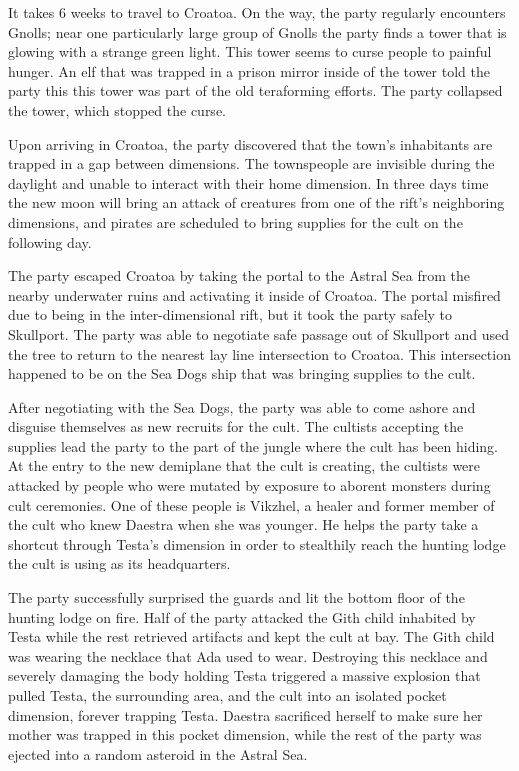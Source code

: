 It takes 6 weeks to travel to Croatoa.
On the way, the party regularly encounters Gnolls; near one particularly large group of Gnolls the party finds a tower that is glowing with a strange green light.
This tower seems to curse people to painful hunger.
An elf that was trapped in a prison mirror inside of the tower told the party this this tower was part of the old teraforming efforts.
The party collapsed the tower, which stopped the curse.

Upon arriving in Croatoa, the party discovered that the town's inhabitants are trapped in a gap between dimensions.
The townspeople are invisible during the daylight and unable to interact with their home dimension.
In three days time the new moon will bring an attack of creatures from one of the rift's neighboring dimensions, and pirates are scheduled to bring supplies for the cult on the following day.

The party escaped Croatoa by taking the portal to the Astral Sea from the nearby underwater ruins and activating it inside of Croatoa.
The portal misfired due to being in the inter-dimensional rift, but it took the party safely to Skullport.
The party was able to negotiate safe passage out of Skullport and used the tree to return to the nearest lay line intersection to Croatoa.
This intersection happened to be on the Sea Dogs ship that was bringing supplies to the cult.

After negotiating with the Sea Dogs, the party was able to come ashore and disguise themselves as new recruits for the cult.
The cultists accepting the supplies lead the party to the part of the jungle where the cult has been hiding.
At the entry to the new demiplane that the cult is creating, the cultists were attacked by people who were mutated by exposure to aborent monsters during cult ceremonies.
One of these people is Vikzhel, a healer and former member of the cult who knew Daestra when she was younger.
He helps the party take a shortcut through Testa's dimension in order to stealthily reach the hunting lodge the cult is using as its headquarters.

The party successfully surprised the guards and lit the bottom floor of the hunting lodge on fire.
Half of the party attacked the Gith child inhabited by Testa while the rest retrieved artifacts and kept the cult at bay.
The Gith child was wearing the necklace that Ada used to wear.
Destroying this necklace and severely damaging the body holding Testa triggered a massive explosion that pulled Testa, the surrounding area, and the cult into an isolated pocket dimension, forever trapping Testa.
Daestra sacrificed herself to make sure her mother was trapped in this pocket dimension, while the rest of the party was ejected into a random asteroid in the Astral Sea.

